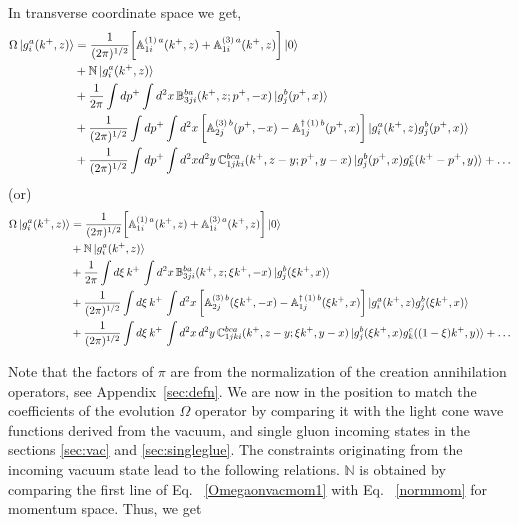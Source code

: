 \documentclass[aps,prd,amsmath,amssymb,nofootinbib]{revtex4-2}
\def\mf#1{\mathbb{#1}}
\numberwithin{equation}{section}
\begin{document}
\begin{itemize}
In transverse coordinate space we get,
\begin{align}\label{Omegaongpos}
    \Omega\ket{g^{a}_{i}(k^{+},z)} & = \frac{1}{(2\pi)^{1/2}} \bigg[\mf{A}^{(1)\, a}_{1i}(k^{+},z)+\mf{A}^{(3)\, a}_{1i}(k^{+},z)\bigg]\ket{0} \notag \\ & 
   + 
   \mf{N}\ket{g^{a}_{i}(k^{+},z )} \notag \\ & 
    + \frac{1}{2\pi}\int  dp^{+}  \int d^2x \,\mf{B}^{ba}_{3ji}(k^+, z;p^+, -x)\ket{g^{b}_{j}(p^+, x)} \notag \\ & 
   + \frac{1}{(2\pi)^{1/2}}\int dp^{+}  \int d^{2}x\,\bigg[\mf{A}^{(3)\, b}_{2j}(p^{+},-x) - \mf{A}^{\dagger\, (1)\, b}_{1j}(p^{+},x)\bigg]  \ket{g^{a}_{i}(k^{+}, z)g^{b}_{j}(p^{+}, x)} \notag \\ & 
    + \frac{1}{(2\pi)^{1/2}}\int dp^{+} \int d^{2}x d^{2}y\, \mf{C}^{bca}_{1jki}(k^{+}, z-y; p^{+}, y-x) \ket{g^{b}_{j}(p^{+}, x)g^{c}_{k}(k^{+}-p^{+}, y)}  + \ldots 
\end{align}
(or)
\begin{align}\label{Omegaongposzeta}
    \Omega\ket{g^{a}_{i}(k^{+},z)} & = 
    \frac{1}{(2\pi)^{1/2}} \bigg[\mf{A}^{(1)\, a}_{1i}(k^{+},z)+\mf{A}^{(3)\, a}_{1i}(k^{+},z)\bigg]\ket{0} \notag \\ & + 
    \mf{N}\ket{g^{a}_{i}(k^{+},z )} \notag \\ & 
    + \frac{1}{2\pi}\int  d\xi \, k^{+}\, \int d^2x \,\mf{B}^{ba}_{3ji}(k^+, z;\xi k^+, -x)\ket{g^{b}_{j}(\xi k^+, x)} \notag \\ & 
    + \frac{1}{(2\pi)^{1/2}}\int d\xi\, k^{+}\, \int d^{2}x\, \bigg[\mf{A}^{(3)\, b}_{2j}(\xi k^{+},-x) - \mf{A}^{\dagger\, (1)\, b}_{1j}(\xi k^{+},x)\bigg]  \ket{g^{a}_{i}(k^{+}, z)g^{b}_{j}(\xi k^{+}, x)} \notag \\ & 
    + \frac{1}{(2\pi)^{1/2}}\int d\xi \, k^{+}\, \int d^{2}x\, d^{2}y\, \mf{C}^{bca}_{1jki}(k^{+}, z-y; \xi k^{+}, y-x) \ket{g^{b}_{j}(\xi k^{+}, x)g^{c}_{k}((1-\xi)k^{+}, y)}   + \ldots  
\end{align}
\end{itemize}
Note that the factors of $\pi$ are from the normalization of the creation annihilation operators, see Appendix~\ref{sec:defn}. We are now in the position to match the coefficients of the evolution $\Omega$ operator by comparing it with the light cone wave functions derived from the vacuum, and single gluon incoming states in the sections \ref{sec:vac} and \ref{sec:singleglue}. The constraints originating from the incoming vacuum state lead to the following relations. $\mf{N}$ is obtained by comparing the first line of Eq.~ \eqref{Omegaonvacmom1} with Eq.~ \eqref{normmom} for momentum space. Thus, we get
\end{document}
